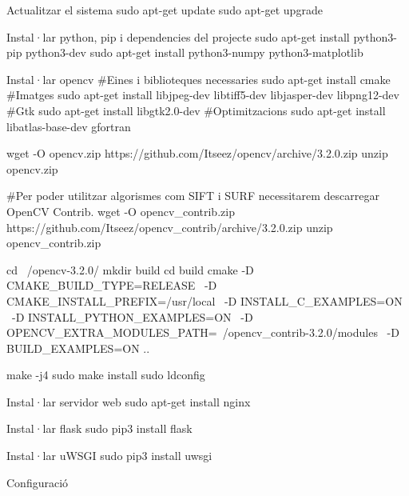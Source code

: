 Actualitzar el sistema
sudo apt-get update
sudo apt-get upgrade


Instal·lar python, pip i dependencies del projecte
sudo apt-get install python3-pip python3-dev
sudo apt-get install python3-numpy python3-matplotlib

Instal·lar opencv
#Eines i biblioteques necessaries
sudo apt-get install cmake
#Imatges
sudo apt-get install libjpeg-dev libtiff5-dev libjasper-dev libpng12-dev
#Gtk
sudo apt-get install libgtk2.0-dev
#Optimitzacions
sudo apt-get install libatlas-base-dev gfortran

wget -O opencv.zip https://github.com/Itseez/opencv/archive/3.2.0.zip
unzip opencv.zip

#Per poder utilitzar algorismes com SIFT i SURF necessitarem descarregar OpenCV Contrib.
wget -O opencv_contrib.zip https://github.com/Itseez/opencv_contrib/archive/3.2.0.zip
unzip opencv_contrib.zip

cd ~/opencv-3.2.0/
mkdir build
cd build
cmake -D CMAKE_BUILD_TYPE=RELEASE \
	-D CMAKE_INSTALL_PREFIX=/usr/local \
	-D INSTALL_C_EXAMPLES=ON \
	-D INSTALL_PYTHON_EXAMPLES=ON \
	-D OPENCV_EXTRA_MODULES_PATH=~/opencv_contrib-3.2.0/modules \
	-D BUILD_EXAMPLES=ON ..

make -j4
sudo make install
sudo ldconfig



Instal·lar servidor web
sudo apt-get install nginx

Instal·lar flask
sudo pip3 install flask

Instal·lar uWSGI
sudo pip3 install uwsgi


Configuració

